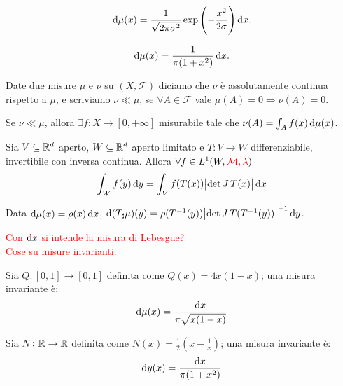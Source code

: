 \begin{example}[Gaussiana su $ \R $]
    \[ \dif\mu(x) = \frac{1}{\sqrt{2\pi\sigma^2}} \exp{\left (-\frac{x^2}{2\sigma}\right )} \dif x. \]
\end{example}

\begin{example}
    \[ \dif\mu(x) = \frac{1}{\pi(1+x^2)}\dif x. \]
\end{example}

\begin{definition}
    Date due misure $ \mu $ e $ \nu $ su $ (X, \mathcal{F}) $ diciamo che $ \nu $ è assolutamente continua rispetto a $ \mu $, e scriviamo $ \nu \ll \mu $, se $ \forall A \in \mathcal{F} $ vale $ \mu(A) = 0 \Rightarrow \nu(A) = 0$.
\end{definition}
\begin{thm}
    Se $ \nu \ll \mu $, allora $ \exists f\colon X\to [0,+\infty] $ misurabile tale che $ \nu(A) = \int_A f(x)\dif\mu(x) $.
\end{thm}

\begin{thm}
    Sia $ V \subseteq\mathbb{R}^d $ aperto, $ W\subseteq\mathbb{R}^d $ aperto limitato e $ T\colon V \to W $ differenziabile, invertibile con inversa continua. Allora $ \forall f\in L^1(W, \textcolor{red}{\mathcal{M}, \lambda}) $
    \[ \int_W f(y)\dif y = \int_V f(T(x)) \abs{\det{\jac{T}(x)}} \dif x \]
\end{thm}
\begin{oss}
    Data $ \dif\mu(x) = \rho(x)\dif x $, $ \dif{(T_\sharp\mu)(y)} = \rho(T^{-1}(y)) \abs{\det{\jac T}(T^{-1}(y))}^{-1} \dif y $.
\end{oss}

\textcolor{red}{Con $ \dif{x} $ si intende la misura di Lebesgue?} \\

\textcolor{red}{Cose su misure invarianti.}

\begin{exercise}
    Sia $ Q\colon [0,1] \to [0,1] $ definita come $ Q(x) = 4x(1-x) $; una misura invariante è:
    \[ \dif\mu(x) = \frac{\dif x}{\pi\sqrt{x(1-x)}} \]
\end{exercise}
\begin{exercise}
    Sia $ N\colon \mathbb{R}\to\mathbb{R} $ definita come $ N(x) = \frac{1}{2} \left( x-\frac{1}{x} \right) $; una misura invariante è:
    \[ \dif y(x) = \frac{\dif x}{\pi(1+x^2)} \]
\end{exercise}
